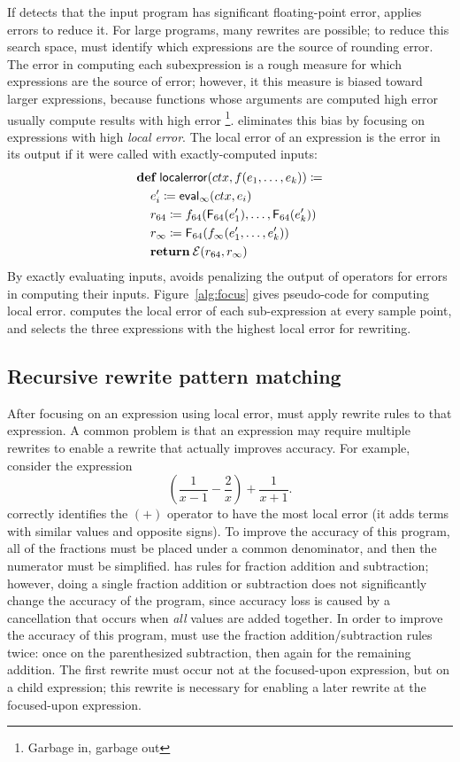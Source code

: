 \documentclass[paper.tex]{subfiles}
\begin{document}
If \casio detects that the input program
  has significant floating-point error,
  \casio applies errors to reduce it.
For large programs, many rewrites are possible;
  to reduce this search space,
  \casio must identify which expressions are the source of rounding error.
The error in computing each subexpression
  is a rough measure for which expressions are the source of error;
  however, it this measure is biased toward larger expressions,
  because functions whose arguments are computed high error
  usually compute results with high error%
  \footnote{Garbage in, garbage out}.
\casio eliminates this bias by focusing on expressions
  with high \emph{local error}.
The local error of an expression
  is the error in its output if it were called with exactly-computed inputs:
\begin{align*}
  &\!def!\:\|localerror|(ctx, f(e_1, \dotsc, e_k)) \ceq \\
  &\> e_i' \ceq \|eval|_\infty(ctx, e_i) \\
  &\> r_{64} \ceq f_{64}(\F_{64}(e_1'), \dotsc, \F_{64}(e_k')) \\
  &\> r_\infty \ceq \F_{64}(f_\infty(e_1', \dotsc, e_k')) \\
  &\> \!return!\:\Err(r_{64}, r_\infty)
\end{align*}
By exactly evaluating inputs,
  \casio avoids penalizing the output of operators
  for errors in computing their inputs.
Figure~\ref{alg:focus} gives pseudo-code for computing local error.
\casio computes the local error of each sub-expression at every sample point,
  and selects the three expressions with the highest local error
  for rewriting.

\subsection{Recursive rewrite pattern matching}

After focusing on an expression using local error,
  \casio must apply rewrite rules to that expression.
A common problem is that an expression may require multiple rewrites
  to enable a rewrite that actually improves accuracy.
For example, consider the expression
\[
 \left(\frac{1}{x-1} - \frac{2}{x} \right) + \frac{1}{x+1}.
\]
\casio correctly identifies the $(+)$ operator
  to have the most local error
  (it adds terms with similar values and opposite signs).
To improve the accuracy of this program,
  all of the fractions must be placed under a common denominator,
  and then the numerator must be simplified.
\casio has rules for fraction addition and subtraction;
  however, doing a single fraction addition or subtraction
  does not significantly change the accuracy of the program,
  since accuracy loss is caused by a cancellation
  that occurs when \emph{all} values are added together.
In order to improve the accuracy of this program,
  \casio must use the fraction addition/subtraction rules twice:
  once on the parenthesized subtraction,
  then again for the remaining addition.
The first rewrite must occur not at the focused-upon expression,
  but on a child expression;
  this rewrite is necessary for enabling a later rewrite
  at the focused-upon expression.
\end{document}
